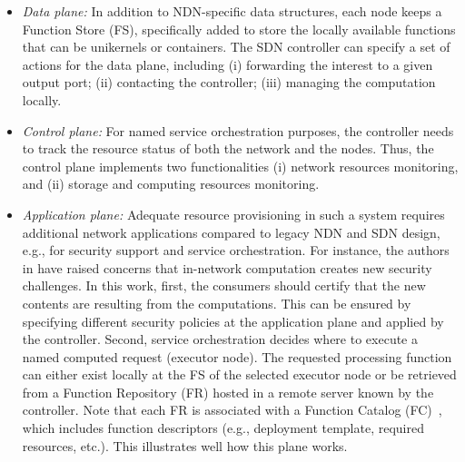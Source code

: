 \begin{itemize}
    \item \textit{Data plane:} In addition to NDN-specific data structures, each node keeps a Function Store (FS), specifically added to store the locally available functions that can be unikernels or containers. The SDN controller can specify a set of actions for the data plane, including (i) forwarding the interest to a given output port; (ii) contacting the controller; (iii) managing the computation locally. 
   \item \textit{Control plane:} For named service orchestration purposes, the controller needs to track the resource status of both the network and the nodes. Thus, the control plane implements two functionalities (i) network resources monitoring, and (ii) storage and computing resources monitoring.
    \item \textit{Application plane:} Adequate resource provisioning in such a system requires additional network applications compared to legacy NDN and SDN design, e.g., for security support and service orchestration. For instance, the authors in \cite{RICE, 8539024} have raised concerns that in-network computation creates new security challenges. In this work, first, the consumers should certify that the new contents are resulting from the computations. This can be ensured by specifying different security policies at the application plane and applied by the controller. Second, service orchestration decides where to execute a named computed request (executor node). The requested processing function can either exist locally at the FS of the selected executor node or be retrieved from a Function Repository (FR) hosted in a remote server known by the controller. Note that each FR is associated with a Function Catalog (FC)~\cite{ETSI}, which includes function descriptors (e.g., deployment template, required resources, etc.). This illustrates
    well how this plane works. 
\end{itemize}


